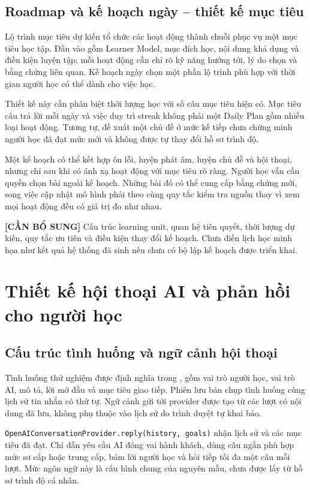 \documentclass[12pt,a4paper,oneside]{report}
\begin{document}
\subsection{Roadmap và kế hoạch ngày -- thiết kế mục tiêu}

Lộ trình mục tiêu dự kiến tổ chức các hoạt động thành chuỗi phục vụ một mục tiêu học tập. Đầu vào gồm Learner Model, mục đích học, nội dung khả dụng và điều kiện luyện tập; mỗi hoạt động cần chỉ rõ kỹ năng hướng tới, lý do chọn và bằng chứng liên quan. Kế hoạch ngày chọn một phần lộ trình phù hợp với thời gian người học có thể dành cho việc học.

Thiết kế này cần phân biệt thời lượng học với số câu mục tiêu hiện có. Mục tiêu câu trả lời mỗi ngày và việc duy trì streak không phải một Daily Plan gồm nhiều loại hoạt động. Tương tự, đề xuất một chủ đề ở mức kế tiếp chưa chứng minh người học đã đạt mức mới và không được tự thay đổi hồ sơ trình độ.

Một kế hoạch có thể kết hợp ôn lỗi, luyện phát âm, luyện chủ đề và hội thoại, nhưng chỉ sau khi có ánh xạ hoạt động với mục tiêu rõ ràng. Người học vẫn cần quyền chọn bài ngoài kế hoạch. Những bài đó có thể cung cấp bằng chứng mới, song việc cập nhật mô hình phải theo cùng quy tắc kiểm tra nguồn thay vì xem mọi hoạt động đều có giá trị đo như nhau.

\noindent\textbf{[CẦN BỔ SUNG]} Cấu trúc learning unit, quan hệ tiên quyết, thời lượng dự kiến, quy tắc ưu tiên và điều kiện thay đổi kế hoạch. Chưa điền lịch học minh họa như kết quả hệ thống đã sinh nếu chưa có bộ lập kế hoạch được triển khai.

\section{Thiết kế hội thoại AI và phản hồi cho người học}

\subsection{Cấu trúc tình huống và ngữ cảnh hội thoại}

Tình huống thử nghiệm được định nghĩa trong , gồm vai trò người học, vai trò AI, mô tả, lời mở đầu và mục tiêu giao tiếp. Phiên lưu bản chụp tình huống cùng lịch sử tin nhắn có thứ tự. Ngữ cảnh gửi tới provider được tạo từ các lượt có nội dung đã lưu, không phụ thuộc vào lịch sử do trình duyệt tự khai báo.

\texttt{OpenAIConversationProvider.reply(history, goals)} nhận lịch sử và các mục tiêu đã đạt. Chỉ dẫn yêu cầu AI đóng vai hành khách, dùng câu ngắn phù hợp mức sơ cấp hoặc trung cấp, bám lời người học và hỏi tiếp tối đa một câu mỗi lượt. Mức ngôn ngữ này là cấu hình chung của nguyên mẫu, chưa được lấy từ hồ sơ trình độ cá nhân.
\end{document}

